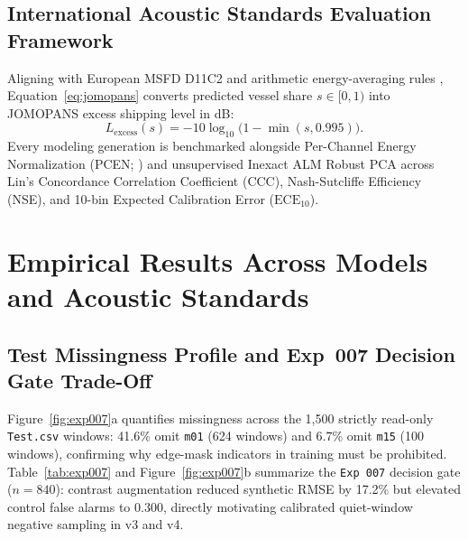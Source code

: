 \documentclass[10pt,a4paper]{article}
\begin{document}
\subsection{International Acoustic Standards Evaluation Framework}

Aligning with European MSFD D11C2 \parencite{farcas2020shipping} and arithmetic energy-averaging rules \parencite{merchant2012averaging}, Equation~\eqref{eq:jomopans} converts predicted vessel share $s \in [0,1)$ into JOMOPANS excess shipping level in dB:
\begin{equation}
\label{eq:jomopans}
L_{\mathrm{excess}}(s) = -10\log_{10}\!\big(1 - \min(s, 0.995)\big).
\end{equation}
Every modeling generation is benchmarked alongside Per-Channel Energy Normalization (PCEN; \citealp{lostanlen2019pcen}) and unsupervised Inexact ALM Robust PCA \parencite{candes2011rpca,lin2017rpca} across Lin's Concordance Correlation Coefficient (CCC), Nash-Sutcliffe Efficiency (NSE), and 10-bin Expected Calibration Error ($\mathrm{ECE}_{10}$).

\section{Empirical Results Across Models and Acoustic Standards}

\subsection{Test Missingness Profile and Exp~007 Decision Gate Trade-Off}

Figure~\ref{fig:exp007}a quantifies missingness across the 1,500 strictly read-only \texttt{Test.csv} windows: 41.6\% omit \texttt{m01} (624 windows) and 6.7\% omit \texttt{m15} (100 windows), confirming why edge-mask indicators in training must be prohibited. Table~\ref{tab:exp007} and Figure~\ref{fig:exp007}b summarize the \texttt{Exp~007} decision gate ($n=840$): contrast augmentation reduced synthetic RMSE by 17.2\% but elevated control false alarms to 0.300, directly motivating calibrated quiet-window negative sampling in v3 and v4.
\end{document}
